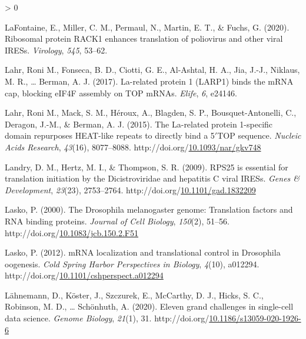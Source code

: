 \documentclass[12pt,oneside]{reedthesis}
\newlength{\cslhangindent}
\newenvironment{CSLReferences}[2] %
 {%
  \setlength{\parindent}{0pt}
  \ifodd #1 \everypar{\setlength{\hangindent}{\cslhangindent}}\ignorespaces\fi
  \ifnum #2 > 0
  \setlength{\parskip}{#2\baselineskip}
  \fi
 }%
 {}
\begin{document}
\begin{CSLReferences}{1}{0}
\leavevmode\hypertarget{ref-lafontaine2020ribosomal}{}%
LaFontaine, E., Miller, C. M., Permaul, N., Martin, E. T., \& Fuchs, G. (2020). Ribosomal protein {RACK1} enhances translation of poliovirus and other viral {IRESs}. \emph{Virology}, \emph{545}, 53--62.

\leavevmode\hypertarget{ref-Lahr2017b}{}%
Lahr, Roni M., Fonseca, B. D., Ciotti, G. E., Al-Ashtal, H. A., Jia, J.-J., Niklaus, M. R., \ldots{} Berman, A. J. (2017). La-related protein 1 ({LARP1}) binds the {mRNA} cap, blocking {eIF4F} assembly on {TOP mRNAs}. \emph{Elife}, \emph{6}, e24146.

\leavevmode\hypertarget{ref-lahrLarelatedProtein1specific2015}{}%
Lahr, Roni M., Mack, S. M., Héroux, A., Blagden, S. P., Bousquet-Antonelli, C., Deragon, J.-M., \& Berman, A. J. (2015). The {La-related} protein 1-specific domain repurposes {HEAT-like} repeats to directly bind a 5{\({'}\)}{TOP} sequence. \emph{Nucleic Acids Research}, \emph{43}(16), 8077--8088. http://doi.org/\href{https://doi.org/10.1093/nar/gkv748}{10.1093/nar/gkv748}

\leavevmode\hypertarget{ref-landryRPS25EssentialTranslation2009}{}%
Landry, D. M., Hertz, M. I., \& Thompson, S. R. (2009). {RPS25} is essential for translation initiation by the {Dicistroviridae} and hepatitis {C} viral {IRESs}. \emph{Genes \& Development}, \emph{23}(23), 2753--2764. http://doi.org/\href{https://doi.org/10.1101/gad.1832209}{10.1101/gad.1832209}

\leavevmode\hypertarget{ref-Lasko2000}{}%
Lasko, P. (2000). The {Drosophila} melanogaster genome: {Translation} factors and {RNA} binding proteins. \emph{Journal of Cell Biology}, \emph{150}(2), 51--56. http://doi.org/\href{https://doi.org/10.1083/jcb.150.2.F51}{10.1083/jcb.150.2.F51}

\leavevmode\hypertarget{ref-Lasko2012a}{}%
Lasko, P. (2012). {mRNA} localization and translational control in {Drosophila} oogenesis. \emph{Cold Spring Harbor Perspectives in Biology}, \emph{4}(10), a012294. http://doi.org/\href{https://doi.org/10.1101/cshperspect.a012294}{10.1101/cshperspect.a012294}

\leavevmode\hypertarget{ref-lahnemannElevenGrandChallenges2020}{}%
Lähnemann, D., Köster, J., Szczurek, E., McCarthy, D. J., Hicks, S. C., Robinson, M. D., \ldots{} Schönhuth, A. (2020). Eleven grand challenges in single-cell data science. \emph{Genome Biology}, \emph{21}(1), 31. http://doi.org/\href{https://doi.org/10.1186/s13059-020-1926-6}{10.1186/s13059-020-1926-6}


\end{CSLReferences}
\end{document}
